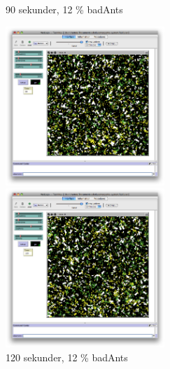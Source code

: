 \documentclass[titlepage, a4paper, 12pt]{article}
\begin{document}
\begin{figure}
  \begin{minipage}[b]{0.5\linewidth} %
    \centering
    \caption{90 sekunder, 12 \% badAnts}
    \includegraphics[width=6cm]{images/60-bad-90.png}
  \end{minipage}
  \hspace{0.5cm} %
  \begin{minipage}[b]{0.5\linewidth}
    \centering
    \caption{120 sekunder, 12 \% badAnts}
    \includegraphics[width=6cm]{images/60-bad-120.png}
  \end{minipage}
  

\end{figure}
\end{document}
